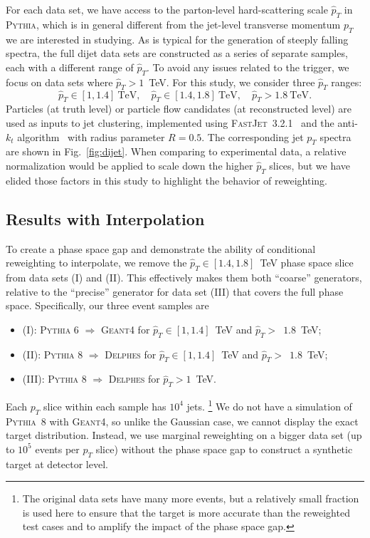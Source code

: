 \documentclass[aps,prx,reprint,preprintnumbers,superscriptaddress,nofootinbib,longbibliography,floatfix]{revtex4-2}
\DeclareRobustCommand{\Fig}[1]{Fig.~\ref{fig:#1}}
\begin{document}
For each data set, we have access to the parton-level hard-scattering scale $\hat{p}_T$ in \textsc{Pythia}, which is in general different from the jet-level transverse momentum $p_T$ we are interested in studying.
%
As is typical for the generation of steeply falling spectra, the full dijet data sets are constructed as a series of separate samples, each with a different range of $\hat{p}_T$.
%
To avoid any issues related to the trigger, we focus on data sets where $\hat{p}_T> 1$~TeV.
%
For this study, we consider three $\hat{p}_T$ ranges:
%
\begin{equation}
\hat{p}_T\in[1,1.4]~\text{TeV},\quad \hat{p}_T\in[1.4,1.8]~\text{TeV}, \quad \hat{p}_T>1.8~\text{TeV}.
\end{equation}
%
Particles (at truth level) or particle flow candidates (at reconstructed level) are used as inputs to jet clustering, implemented using \textsc{FastJet}~3.2.1~\cite{Cacciari:2011ma,Cacciari:2005hq} and the anti-$k_t$ algorithm~\cite{Cacciari:2008gp} with radius parameter $R=0.5$.
%
The corresponding jet $p_T$ spectra are shown in \Fig{dijet}.
%
When comparing to experimental data, a relative normalization would be applied to scale down the higher $\hat{p}_T$ slices, but we have elided those factors in this study to highlight the behavior of reweighting.


\subsection{Results with Interpolation}


To create a phase space gap and demonstrate the ability of conditional reweighting to interpolate, we remove the $\hat{p}_T\in[1.4,1.8]$~TeV phase space slice from data sets (I) and (II).
%
This effectively makes them both ``coarse'' generators, relative to the ``precise'' generator for data set (III) that covers the full phase space.
%
Specifically, our three event samples are
%
\begin{itemize}
    \item (I): \textsc{Pythia 6} $\Rightarrow$ \textsc{Geant4} for $\hat{p}_T\in[1,1.4]$~TeV and $\hat{p}_T>$~$1.8$~TeV; 
    \item (II): \textsc{Pythia 8} $\Rightarrow$ \textsc{Delphes} for $\hat{p}_T\in[1,1.4]$~TeV and $\hat{p}_T>$~$1.8$~TeV;
    \item (III): \textsc{Pythia 8} $\Rightarrow$ \textsc{Delphes} for $\hat{p}_T >1$~TeV.
\end{itemize}
%
Each $p_T$ slice within each sample has $10^4$ jets.%
%
\footnote{The original data sets have many more events, but a relatively small fraction is used here to ensure that the target is more accurate than the reweighted test cases and to amplify the impact of the phase space gap.}
%
We do not have a simulation of \textsc{Pythia}~8 with \textsc{Geant4}, so unlike the Gaussian case, we cannot display the exact target distribution. 
%
Instead, we use marginal reweighting on a bigger data set (up to $10^5$ events per $p_T$ slice) without the phase space gap to construct a synthetic target at detector level.
\end{document}
